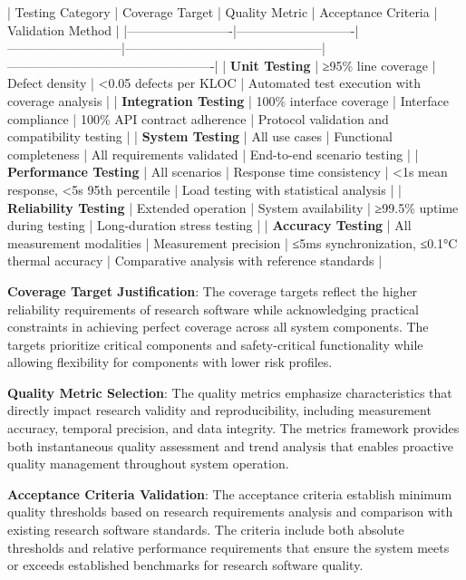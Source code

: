 \documentclass[11pt,a4paper]{report}
\begin{document}
| Testing Category        | Coverage Target            | Quality Metric            | Acceptance Criteria                           | Validation Method                               |
|-------------------------|----------------------------|---------------------------|-----------------------------------------------|-------------------------------------------------|
| \textbf{Unit Testing}        | ≥95\% line coverage         | Defect density            | <0.05 defects per KLOC                        | Automated test execution with coverage analysis |
| \textbf{Integration Testing} | 100\% interface coverage    | Interface compliance      | 100\% API contract adherence                   | Protocol validation and compatibility testing   |
| \textbf{System Testing}      | All use cases              | Functional completeness   | All requirements validated                    | End-to-end scenario testing                     |
| \textbf{Performance Testing} | All scenarios              | Response time consistency | <1s mean response, <5s 95th percentile        | Load testing with statistical analysis          |
| \textbf{Reliability Testing} | Extended operation         | System availability       | ≥99.5\% uptime during testing                  | Long-duration stress testing                    |
| \textbf{Accuracy Testing}    | All measurement modalities | Measurement precision     | ≤5ms synchronization, ≤0.1°C thermal accuracy | Comparative analysis with reference standards   |

\textbf{Coverage Target Justification}: The coverage targets reflect the higher reliability requirements of research software
while acknowledging practical constraints in achieving perfect coverage across all system components. The targets
prioritize critical components and safety-critical functionality while allowing flexibility for components with lower
risk profiles.

\textbf{Quality Metric Selection}: The quality metrics emphasize characteristics that directly impact research validity and
reproducibility, including measurement accuracy, temporal precision, and data integrity. The metrics framework provides
both instantaneous quality assessment and trend analysis that enables proactive quality management throughout system
operation.

\textbf{Acceptance Criteria Validation}: The acceptance criteria establish minimum quality thresholds based on research
requirements analysis and comparison with existing research software standards. The criteria include both absolute
thresholds and relative performance requirements that ensure the system meets or exceeds established benchmarks for
research software quality.
\end{document}
